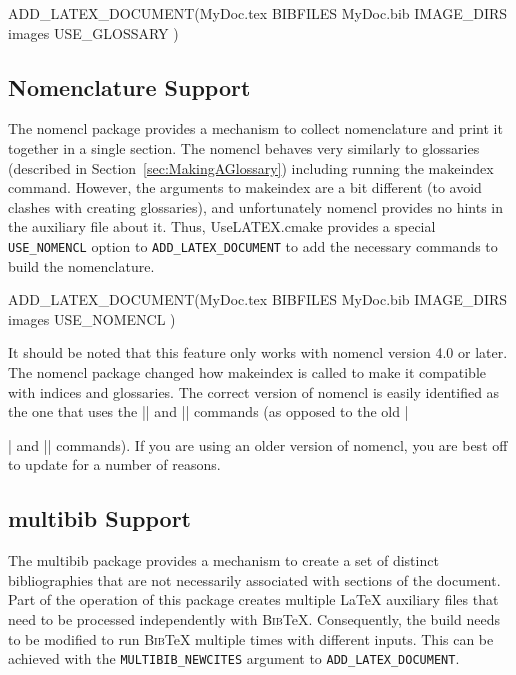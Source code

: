 \documentclass{article}
\newcommand*{\textfile}[1]{\textsf{#1}}
\newcommand*{\textprog}[1]{\textfile{#1}}
\newcommand*{\textlatexpackage}[1]{\textsf{#1}}
\newcommand*{\textcmake}[1]{\texttt{#1}}
\newcommand*{\UseLATEX}{\textfile{UseLATEX.cmake}\xspace}
\newcommand*{\latex}{\LaTeX\xspace}
\newcommand*{\bibtex}{\textsc{Bib}\TeX\xspace}
\newcommand*{\ald}{\textcmake{ADD\_LATEX\_DOCUMENT}\xspace}
\begin{document}
  \begin{CodeListing}
ADD_LATEX_DOCUMENT(MyDoc.tex
  BIBFILES MyDoc.bib
  IMAGE_DIRS images
  USE_GLOSSARY
  )
  \end{CodeListing}

  \subsection{Nomenclature Support}
  \label{sec:NomenclatureSupport}

  The \textlatexpackage{nomencl} package provides a mechanism to collect
  nomenclature and print it together in a single section.  The
  \textlatexpackage{nomencl} behaves very similarly to
  \textlatexpackage{glossaries} (described in
  Section~\ref{sec:MakingAGlossary}) including running the
  \textprog{makeindex} command.  However, the arguments to
  \textprog{makeindex} are a bit different (to avoid clashes with creating
  glossaries), and unfortunately \textlatexpackage{nomencl} provides no
  hints in the auxiliary file about it.  Thus, \UseLATEX provides a special
  \textcmake{USE\_NOMENCL} option to \ald to add the necessary commands to
  build the nomenclature.

  \begin{CodeListing}
ADD_LATEX_DOCUMENT(MyDoc.tex
  BIBFILES MyDoc.bib
  IMAGE_DIRS images
  USE_NOMENCL
  )
  \end{CodeListing}

  It should be noted that this feature only works with
  \textlatexpackage{nomencl} version 4.0 or later.  The
  \textlatexpackage{nomencl} package changed how \textprog{makeindex} is
  called to make it compatible with indices and glossaries.  The correct
  version of \textlatexpackage{nomencl} is easily identified as the one
  that uses the \textlatex|\makenomenclature| and
  \textlatex|\printnomenclature| commands (as opposed to the old
  \textlatex|\makeglossary| and \textlatex|\printglossary| commands).  If
  you are using an older version of \textlatexpackage{nomencl}, you are
  best off to update for a number of reasons.

  \subsection{\textlatexpackage{multibib} Support}
  \label{sec:multibibSupport}

  The \textlatexpackage{multibib} package provides a mechanism to create a
  set of distinct bibliographies that are not necessarily associated with
  sections of the document.  Part of the operation of this package creates
  multiple \latex auxiliary files that need to be processed independently
  with \bibtex.  Consequently, the build needs to be modified to run
  \bibtex multiple times with different inputs.  This can be achieved with
  the \textcmake{MULTIBIB\_NEWCITES} argument to \ald.
\end{document}

